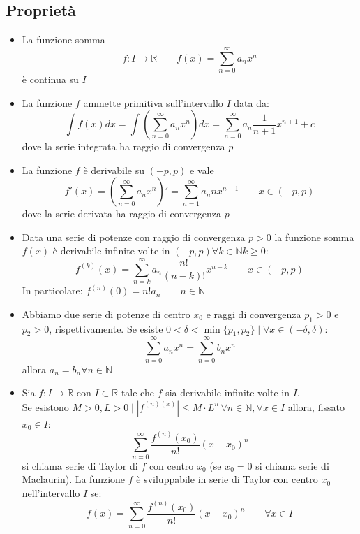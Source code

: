\documentclass[10pt, a4paper]{article}
\begin{document}
    \subsection{Proprietà}
    \begin{itemize}
        \item La funzione somma \begin{equation*}
            f:I\rightarrow \mathbb{R} \qquad f(x)=\sum_{n=0}^{\infty}a_nx^n
        \end{equation*}
        è continua su $I$
        \item La funzione $f$ ammette primitiva sull'intervallo $I$ data da:
        \begin{equation*}
            \int f(x)dx = \int\left(\sum_{n=0}^{\infty}a_nx^n\right)dx=\sum_{n=0}^{\infty}a_n\frac{1}{n+1}x^{n+1}+c
        \end{equation*}
        dove la serie integrata ha raggio di convergenza $p$
        \item La funzione $f$ è derivabile su $(-p,p)$ e vale \begin{equation*}
            f'(x) = \left(\sum_{n=0}^{\infty}a_nx^n\right)'=\sum_{n=1}^{\infty}a_nnx^{n-1} \qquad x\in (-p,p)
        \end{equation*}
        dove la serie derivata ha raggio di convergenza $p$
        \item Data una serie di potenze con  raggio di convergenza $p>0$ la funzione somma $f(x)$ è derivabile infinite volte in $(-p,p)\forall k\in\mathbb{N}k\geq 0$: \begin{equation*}
            f^{(k)}(x)=\sum_{n=k}^{\infty}a_n\frac{n!}{(n-k)!}x^{n-k} \qquad x\in(-p,p)
        \end{equation*}
        In particolare: $f^{(n)}(0) = n!a_n \qquad n\in\mathbb{N}$
        \item Abbiamo due serie di potenze di centro $x_0$ e raggi di convergenza $p_1>0$ e $p_2>0$, rispettivamente. Se esiste $0<\delta<\min\{p_1,p_2\}\mid\forall x\in(-\delta,\delta)$:
        \begin{equation*}
            \sum_{n=0}^{\infty}a_nx^n = \sum_{n=0}^{\infty}b_nx^n 
        \end{equation*}
        allora $a_n=b_n\forall n\in\mathbb{N}$
        \item Sia $f: I\rightarrow\mathbb{R}$ con $I\subset\mathbb{R}$ tale che $f$ sia derivabile infinite volte in $I$.\\
        Se esistono $M>0,L>0\mid\left|f^{(n)(x)}\right|\leq M\cdot L^n \,\forall n\in\mathbb{N},\forall x\in I$ allora, fissato $x_0\in I$:
        \begin{equation*}
            \sum_{n=0}^{\infty}\frac{f^{(n)}(x_0)}{n!}(x-x_0)^n
        \end{equation*}
        si chiama serie di Taylor di $f$ con centro $x_0$ (se $x_0=0$ si chiama serie di Maclaurin). La funzione $f$ è sviluppabile in serie di Taylor con centro $x_0$ nell'intervallo $I$ se: \begin{equation*}
            f(x) = \sum_{n=0}^{\infty}\frac{f^{(n)}(x_0)}{n!}(x-x_0)^n \qquad \forall x\in I
        \end{equation*}
    \end{itemize}
    \fi
\end{document}
